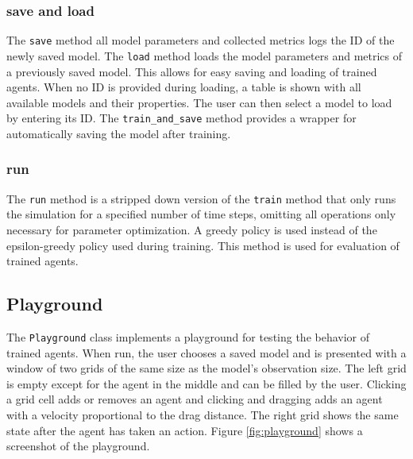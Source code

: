 \subsubsection{save and load}
The \texttt{save} method all model parameters and collected metrics logs the ID of the newly saved model. The \texttt{load} method loads the model parameters and metrics of a previously saved model. This allows for easy saving and loading of trained agents. When no ID is provided during loading, a table is shown with all available models and their properties. The user can then select a model to load by entering its ID. The \texttt{train\_and\_save} method provides a wrapper for automatically saving the model after training.

\subsubsection{run}
The \texttt{run} method is a stripped down version of the \texttt{train} method that only runs the simulation for a specified number of time steps, omitting all operations only necessary for parameter optimization. A greedy policy is used instead of the epsilon-greedy policy used during training. This method is used for evaluation of trained agents. 


\subsection{Playground}
\label{subsec:implementation-playground}
The \texttt{Playground} class implements a playground for testing the behavior of trained agents. When run, the user chooses a saved model and is presented with a window of two grids of the same size as the model's observation size. The left grid is empty except for the agent in the middle and can be filled by the user. Clicking a grid cell adds or removes an agent and clicking and dragging adds an agent with a velocity proportional to the drag distance. The right grid shows the same state after the agent has taken an action. Figure \ref{fig:playground} shows a screenshot of the playground.

